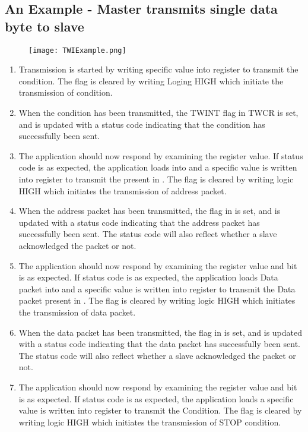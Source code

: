 \subsection{An Example - Master transmits single data byte to slave}
\begin{figure}[H]
    \centering
    \texttt{[image: TWIExample.png]}
\end{figure}
\begin{enumerate}
    \item Transmission is started by writing specific value into  register to transmit the  condition. The  flag is cleared by writing Loging HIGH which initiate the transmission of  condition.
    \item When the  condition has been transmitted, the TWINT flag in TWCR is set, and  is updated with a status code indicating that the  condition has successfully been sent.
    \item The application should now respond by examining the  register value. If status code is as expected, the application loads  into  and a specific value is written into  register to transmit the  present in . The  flag is cleared by writing logic HIGH which initiates the transmission of address packet.
    \item When the address packet has been transmitted, the  flag in  is set, and  is updated with a status code indicating that the address packet has successfully been sent. The status code will also reflect whether a slave acknowledged the packet or not.
    \item The application should now respond by examining the  register value and  bit is as expected. If status code is as expected, the application loads Data packet into  and a specific value is written into  register to transmit the Data packet present in . The  flag is cleared by writing logic HIGH which initiates the transmission of data packet.
    \item When the data packet has been transmitted, the  flag in  is set, and  is updated with a status code indicating that the data packet has successfully been sent. The status code will also reflect whether a slave acknowledged the packet or not.
    \item The application should now respond by examining the  register value and  bit is as expected. If status code is as expected, the application loads a specific value is written into  register to transmit the  Condition. The  flag is cleared by writing logic HIGH which initiates the transmission of STOP condition.
\end{enumerate}

